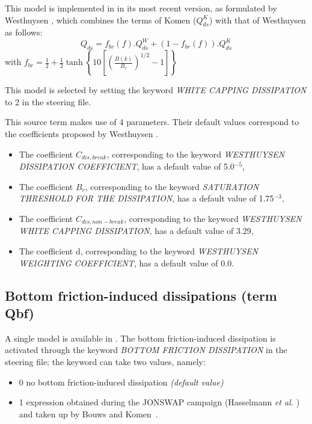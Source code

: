 This model is implemented in \tomawac in its most recent version, as formulated by Westhuysen \cite{Westhuys2008}, which combines the terms of Komen \cite{Komen1984} ($Q_{ds}^{K}$) with that of Westhuysen \cite{Westhuys2007} as follows:
\begin{equation} \label{GrindEQ__4_41_}
Q_{ds} =f_{br} (f).Q_{ds} ^{W} +\left(1-f_{br} (f)\right).Q_{ds} ^{K}
\end{equation}
with $f_{br} =\frac{1}{2} +\frac{1}{2} \tanh \left\{10\left[\left(\frac{B(k)}{B_{r} } \right)^{1/2} -1\right]\right\}$

 This model is selected by setting the keyword \textit{WHITE CAPPING DISSIPATION} to 2 in the steering file.\textbf{}

 This source term makes use of 4 parameters. Their default values correspond to the coefficients proposed by Westhuysen  \cite{Westhuys2008}.

\begin{itemize}
\item  The coefficient ${C}_{dis,break}$, corresponding to the keyword \textit{WESTHUYSEN  DISSIPATION COEFFICIENT}, has a default value of 5.0${}^{-5}$,
\item  The coefficient ${B}_{r}$, corresponding to the keyword \textit{SATURATION THRESHOLD FOR THE DISSIPATION}, has a default value of 1.75${}^{-3}$,
\item  The coefficient ${C}_{dis,non-break}$, corresponding to the keyword \textit{WESTHUYSEN WHITE CAP\-PING DISSIPATION}, has a default value of 3.29,
\item  The coefficient d, corresponding to the keyword \textit{WESTHUYSEN WEIGHTING COEFFICIENT}, has a default value of 0.0.
\end{itemize}


\subsection{ Bottom friction-induced dissipations (term Qbf)}

 A single model is available in \tomawac. The bottom friction-induced dissipation is activated through the keyword \textit{BOTTOM FRICTION DISSIPATION} in the steering file; the keyword can take two values, namely:

 \begin{itemize}
\item 0 no bottom friction-induced dissipation \textit{(default value)}

\item 1 expression obtained during the JONSWAP campaign (Hasselmann \textit{et al.} \cite{Hasselmann1973}) and taken up by Bouws and Komen~\cite{Bouws1983}.
\end{itemize}

